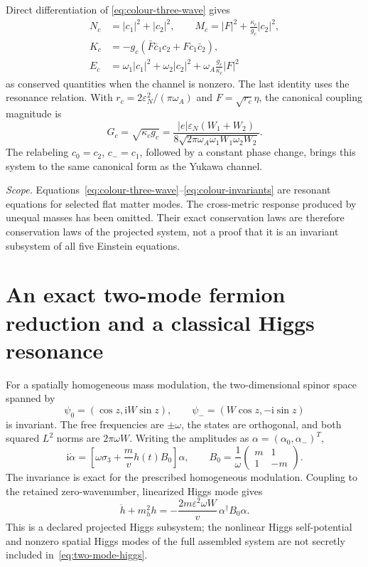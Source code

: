 \documentclass[11pt,a4paper,oneside]{book}
\theoremstyle{plain}
\theoremstyle{definition}
\theoremstyle{remark}
\newcommand{\ii}{\mathrm i}
\newcommand{\scope}[1]{\par\smallskip\noindent\textit{Scope.} #1\par\smallskip}
\begin{document}
Direct differentiation of \eqref{eq:colour-three-wave} gives
\begin{align}
 N_c&=|c_1|^2+|c_2|^2,\qquad
 M_c=|F|^2+\frac{\kappa_c}{g_c}|c_2|^2,\\
 K_c&=-g_c(\bar F\bar c_1c_2+Fc_1\bar c_2),\\
 E_c&=\omega_1|c_1|^2+\omega_2|c_2|^2
                  +\omega_A\frac{g_c}{\kappa_c}|F|^2
 \label{eq:colour-invariants}
\end{align}
as conserved quantities when the channel is nonzero.  The last identity
uses the resonance relation.  With
$r_c=2\varepsilon_N^2/(\pi\omega_A)$ and $F=\sqrt{r_c}\eta$, the
canonical coupling magnitude is
\begin{equation}
 G_c=\sqrt{\kappa_cg_c}
 =\frac{|e|\varepsilon_N(W_1+W_2)}
 {8\sqrt{2\pi\omega_A\omega_1W_1\omega_2W_2}}.
 \label{eq:canonical-colour-coupling}
\end{equation}
The relabeling $c_0=c_2$, $c_-=c_1$, followed by a constant phase change,
brings this system to the same canonical form as the Yukawa channel.

\scope{Equations~\eqref{eq:colour-three-wave}--\eqref{eq:colour-invariants}
are resonant equations for selected flat matter modes.  The cross-metric
response produced by unequal masses has been omitted.  Their exact
conservation laws are therefore conservation laws of the projected
system, not a proof that it is an invariant subsystem of all five
Einstein equations.}


\section{An exact two-mode fermion reduction and a classical Higgs resonance}
For a spatially homogeneous mass modulation, the two-dimensional spinor space spanned by
\begin{equation}
 \psi_0=(\cos z,\ii W\sin z),\qquad
 \psi_-=(W\cos z,-\ii\sin z)
\end{equation}
is invariant. The free frequencies are $\pm\omega$, the states are orthogonal, and both squared $L^2$ norms are $2\pi\omega W$. Writing the amplitudes as $\alpha=(\alpha_0,\alpha_-)^T$,
\begin{equation}
 \ii\dot\alpha=
 \left[\omega\sigma_3+\frac mvh(t)B_0\right]\alpha,
 \qquad
 B_0=\frac1\omega\begin{pmatrix}m&1\\1&-m\end{pmatrix}.
 \label{eq:two-mode-dirac}
\end{equation}
The invariance is exact for the prescribed homogeneous modulation. Coupling to the retained zero-wavenumber, linearized Higgs mode gives
\begin{equation}
 \ddot h+m_h^2h
 =-\frac{2m\varepsilon^2\omega W}{v}\,\alpha^\dagger B_0\alpha.
 \label{eq:two-mode-higgs}
\end{equation}
This is a declared projected Higgs subsystem; the nonlinear Higgs self-potential and nonzero spatial Higgs modes of the full assembled system are not secretly included in~\eqref{eq:two-mode-higgs}.
\end{document}
